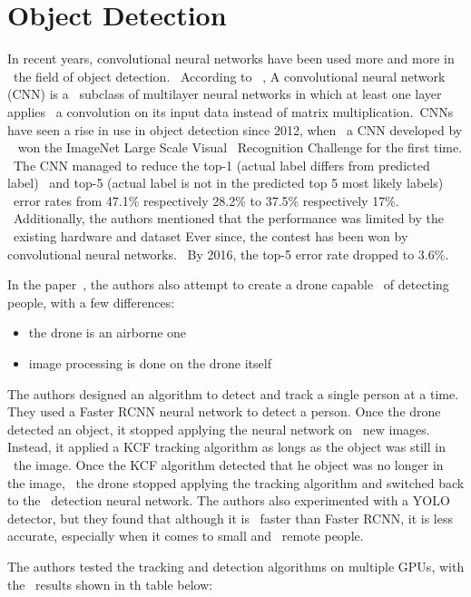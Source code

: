 \section{Object Detection}
\label{sec:research-object-detection}
In recent years, convolutional neural networks have been used more and more in \
the field of object detection. \
According to ~\cite{deepLearning}, A convolutional neural network (CNN) is a \
subclass of multilayer neural networks in which at least one layer applies \
a convolution on its input data instead of matrix multiplication.\
CNNs have seen a rise in use in object detection since 2012, when \
a CNN developed by ~\cite{imagenet} won the ImageNet Large Scale Visual \
Recognition Challenge for the first time. \
The CNN managed to reduce the top-1 (actual label differs from predicted label) \
 and top-5 (actual label is not in the predicted top 5 most likely labels) \
error rates from 47.1\% respectively 28.2\% to 37.5\% respectively 17\%. \
Additionally, the authors mentioned that the performance was limited by the \
existing hardware and dataset
Ever since, the contest has been won by convolutional neural networks. \
By 2016, the top-5 error rate dropped to 3.6\%.



In the paper~\cite{deepDrone}, the authors also attempt to create a drone capable \
of detecting people, with a few differences:
\begin{itemize}
    \item the drone is an airborne one
    \item image processing is done on the drone itself
\end{itemize}

The authors designed an algorithm to detect and track a single person at a time.
They used a Faster RCNN neural network to detect a person.
Once the drone detected an object, it stopped applying the neural network on \
new images.
Instead, it applied a KCF tracking algorithm as longs as the object was still in \
the image.
Once the KCF algorithm detected that he object was no longer in the image, \
the drone stopped applying the tracking algorithm and switched back to the \
detection neural network.
The authors also experimented with a YOLO detector, but they found that although it is \
faster than Faster RCNN, it is less accurate, especially when it comes to small and \
remote people.

The authors tested the tracking and detection algorithms on multiple GPUs, with the \
results shown in th table below:

